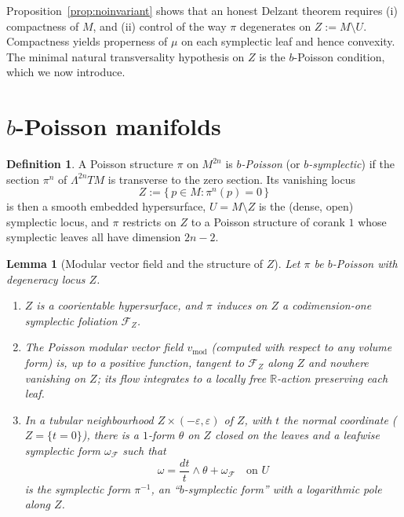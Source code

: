 \documentclass{amsart}
\newtheorem{lemma}{Lemma}
\theoremstyle{definition}
\newtheorem{definition}{Definition}
\begin{document}
Proposition~\ref{prop:noinvariant} shows that an honest Delzant theorem
requires (i) compactness of $M$, and (ii) control of the way $\pi$ degenerates
on $Z:=M\setminus U$. Compactness yields properness of $\mu$ on each symplectic
leaf and hence convexity. The minimal natural transversality hypothesis on
$Z$ is the $b$-Poisson condition, which we now introduce.

\section{$b$-Poisson manifolds}

\begin{definition}\label{def:bpoisson}
A Poisson structure $\pi$ on $M^{2n}$ is \emph{$b$-Poisson} (or
\emph{$b$-symplectic}) if the section $\pi^n$ of $\Lambda^{2n}TM$ is transverse
to the zero section. Its vanishing locus
\[
Z:=\{\,p\in M:\pi^n(p)=0\,\}
\]
is then a smooth embedded hypersurface, $U=M\setminus Z$ is the (dense, open)
symplectic locus, and $\pi$ restricts on $Z$ to a Poisson structure of corank
$1$ whose symplectic leaves all have dimension $2n-2$.
\end{definition}

\begin{lemma}[Modular vector field and the structure of $Z$]\label{lem:Z}
Let $\pi$ be $b$-Poisson with degeneracy locus $Z$.
\begin{enumerate}
\item $Z$ is a coorientable hypersurface, and $\pi$ induces on $Z$ a
codimension-one symplectic foliation $\mathcal F_Z$.
\item The Poisson \emph{modular vector field} $v_{\mathrm{mod}}$ (computed with
respect to any volume form) is, up to a positive function, tangent to
$\mathcal F_Z$ along $Z$ and nowhere vanishing on $Z$; its flow integrates to a
locally free $\mathbb R$-action preserving each leaf.
\item In a tubular neighbourhood $Z\times(-\varepsilon,\varepsilon)$ of $Z$,
with $t$ the normal coordinate ($Z=\{t=0\}$), there is a $1$-form $\theta$ on
$Z$ closed on the leaves and a leafwise symplectic form $\omega_{\mathcal F}$
such that
\begin{equation}\label{eq:bnf}
\omega=\frac{dt}{t}\wedge\theta+\omega_{\mathcal F}\quad\text{on }U
\end{equation}
is the symplectic form $\pi^{-1}$, an ``$b$-symplectic form'' with a
logarithmic pole along $Z$.
\end{enumerate}
\end{lemma}
\end{document}
